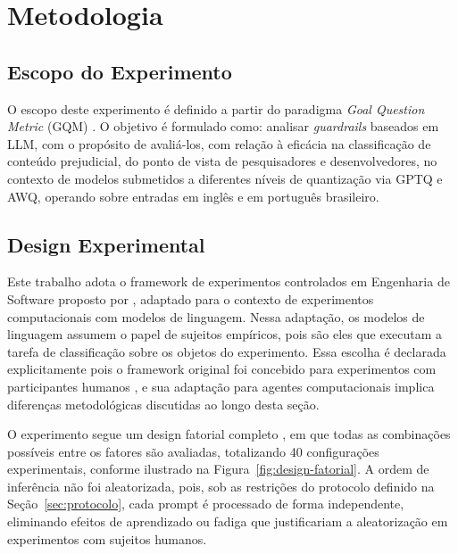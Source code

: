 \chapter{Metodologia}
\label{cap:metodologia}

\section{Escopo do Experimento}
\label{sec:escopo}

O escopo deste experimento é definido a partir do paradigma \textit{Goal Question Metric} (GQM) \cite{basili1994gqm}. O objetivo é formulado como: analisar \textit{guardrails} baseados em LLM, com o propósito de avaliá-los, com relação à eficácia na classificação de conteúdo prejudicial, do ponto de vista de pesquisadores e desenvolvedores, no contexto de modelos submetidos a diferentes níveis de quantização via GPTQ e AWQ, operando sobre entradas em inglês e em português brasileiro.

\section{Design Experimental}
\label{sec:design}

Este trabalho adota o framework de experimentos controlados em Engenharia de Software proposto por , adaptado para o contexto de experimentos computacionais com modelos de linguagem. Nessa adaptação, os modelos de linguagem assumem o papel de sujeitos empíricos, pois são eles que executam a tarefa de classificação sobre os objetos do experimento. Essa escolha é declarada explicitamente pois o framework original foi concebido para experimentos com participantes humanos \cite{wohlin2012experimentation}, e sua adaptação para agentes computacionais implica diferenças metodológicas discutidas ao longo desta seção.

O experimento segue um design fatorial completo \cite{wohlin2012experimentation}, em que todas as combinações possíveis entre os fatores são avaliadas, totalizando 40 configurações experimentais, conforme ilustrado na Figura~\ref{fig:design-fatorial}. A ordem de inferência não foi aleatorizada, pois, sob as restrições do protocolo definido na Seção~\ref{sec:protocolo}, cada prompt é processado de forma independente, eliminando efeitos de aprendizado ou fadiga \cite{wohlin2012experimentation} que justificariam a aleatorização em experimentos com sujeitos humanos.

